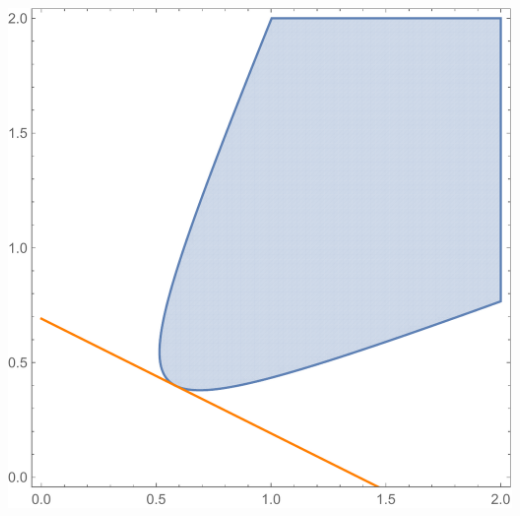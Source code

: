 \documentclass{beamer}
\begin{document}
\begin{frame}
\begin{columns}
\begin{column}{0.4\textwidth}
        \includegraphics[width=\textwidth]{jump-toy-2-benchmark-feasible-domain-and-result.pdf}
    \end{column}
\end{columns}

\end{frame}
\end{document}
